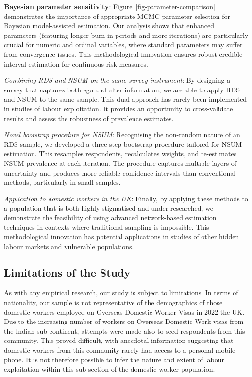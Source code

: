 \documentclass[
  12pt,
  letterpaper,
  DIV=11,
  numbers=noendperiod]{scrartcl}
\theoremstyle{plain}
\theoremstyle{definition}
\begin{document}
\textbf{Bayesian parameter sensitivity}:
Figure~\ref{fig-parameter-comparison} demonstrates the importance of
appropriate MCMC parameter selection for Bayesian model-assisted
estimation. Our analysis shows that enhanced parameters (featuring
longer burn-in periods and more iterations) are particularly crucial for
numeric and ordinal variables, where standard parameters may suffer from
convergence issues. This methodological innovation ensures robust
credible interval estimation for continuous risk measures.

\emph{Combining RDS and NSUM on the same survey instrument}: By
designing a survey that captures both ego and alter information, we are
able to apply RDS and NSUM to the same sample. This dual approach has
rarely been implemented in studies of labour exploitation. It provides
an opportunity to cross-validate results and assess the robustness of
prevalence estimates.

\emph{Novel bootstrap procedure for NSUM}: Recognising the non-random
nature of an RDS sample, we developed a three-step bootstrap procedure
tailored for NSUM estimation. This resamples respondents, recalculates
weights, and re-estimates NSUM prevalence at each iteration. The
procedure captures multiple layers of uncertainty and produces more
reliable confidence intervals than conventional methods, particularly in
small samples.

\emph{Application to domestic workers in the UK}: Finally, by applying
these methods to a population that is both highly stigmatised and
under-researched, we demonstrate the feasibility of using advanced
network-based estimation techniques in contexts where traditional
sampling is impossible. This methodological innovation has potential
applications in studies of other hidden labour markets and vulnerable
populations.

\subsection{Limitations of the Study}\label{limitations-of-the-study}

As with any empirical research, our study is subject to limitations. In
terms of nationality, our sample is not representative of the
demographics of those domestic workers employed on Overseas Domestic
Worker Visas in 2022 the UK. Due to the increasing number of workers on
Overseas Domestic Work visas from the Indian sub-continent, attempts
were made also to seed respondents from this community. This proved
difficult, with anecdotal information suggesting that domestic workers
from this community rarely had access to a personal mobile phone. It is
not therefore possible to infer the nature and extent of labour
exploitation within this sub-section of the domestic worker population.
\end{document}
